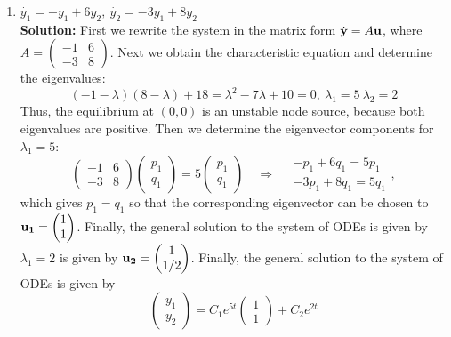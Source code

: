 \documentclass[11pt,a4paper]{article}
\begin{document}
	\begin{enumerate}[\bfseries 1)]
		\item $\dot{y_1} = -y_1+6y_2,\ \dot{y_2} = -3y_1 + 8y_2$\\
		\textbf{Solution:} First we rewrite the system in the matrix form $\dot{\vb{y}} = A\vb{u}$, where
		$A
		=
		\begin{pmatrix}
			-1 & 6\\
			-3 & 8
		\end{pmatrix}
		$.
		Next we obtain the characteristic equation and determine the eigenvalues:
		$$
		(-1-\lambda)(8-\lambda)+18
		= \lambda^2-7\lambda + 10
		= 0,\ \lambda_1 = 5\ \lambda_2 = 2
		$$
		Thus, the equilibrium at $(0, 0)$ is an unstable node source, because both eigenvalues are positive. Then we determine the eigenvector components for $\lambda_1 = 5$:
		$$
		\begin{pmatrix}
			-1 & 6\\
			-3 & 8
		\end{pmatrix}
		\begin{pmatrix}
			p_1\\
			q_1
		\end{pmatrix}
		=
		5
		\begin{pmatrix}
			p_1\\
			q_1
		\end{pmatrix}
		\quad
		\Rightarrow
		\quad
		\begin{array}{l}
			-p_1 + 6q_1 = 5p_1\\
			-3p_1 + 8q_1 = 5q_1
		\end{array},
		$$
		which gives $p_1 = q_1$ so that the corresponding eigenvector can be chosen to
		$
		\vb{u_1}
		=
		\begin{pmatrix}
			1\\
			1
		\end{pmatrix}
		$.
		Finally, the general solution to the system of ODEs is given by $\lambda_1 = 2$ is given by 
		$
		\vb{u_2}
		=
		\begin{pmatrix}
			1\\
			1/2
		\end{pmatrix}
		$.
		Finally, the general solution to the system of ODEs is given by
		$$
		\begin{pmatrix}
			y_1\\
			y_2
		\end{pmatrix}
		=
		C_1e^{5t}
		\begin{pmatrix}
			1\\
			1
		\end{pmatrix}
		+ C_2e^{2t}
$$
\end{enumerate}
\end{document}
